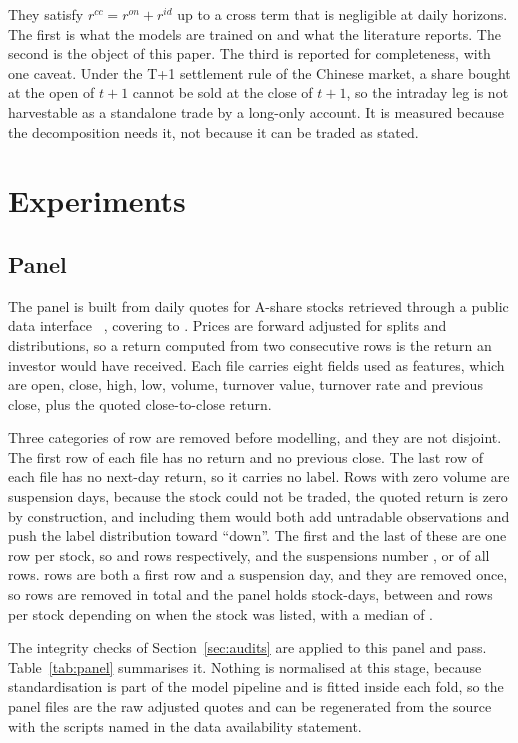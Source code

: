 \documentclass[pdflatex,sn-mathphys-ay]{sn-jnl}
\theoremstyle{thmstyleone}%
\theoremstyle{thmstyletwo}%
\theoremstyle{thmstyletwo}%
\begin{document}
They satisfy $r^{cc} = r^{on} + r^{id}$ up to a cross term that is negligible at daily horizons. The
first is what the models are trained on and what the literature reports. The second is the object of
this paper. The third is reported for completeness, with one caveat. Under the T+1 settlement rule of
the Chinese market, a share bought at the open of $t+1$ cannot be sold at the close of $t+1$, so the
intraday leg is not harvestable as a standalone trade by a long-only account. It is measured because
the decomposition needs it, not because it can be traded as stated.

\section{Experiments}\label{sec5}

\subsection{Panel}

The panel is built from daily quotes for \nStocks{} A-share stocks retrieved through a public data
interface ~\citep{baostock}, covering \firstDate{} to \lastDate{}. Prices are forward adjusted for
splits and distributions, so a return computed from two consecutive rows is the return an investor
would have received. Each file carries eight fields used as features, which are open, close, high,
low, volume, turnover value, turnover rate and previous close, plus the quoted close-to-close return.

Three categories of row are removed before modelling, and they are not disjoint. The first row of each
file has no return and no previous close. The last row of each file has no next-day return, so it
carries no label. Rows with zero volume are suspension days, because the stock could not be traded,
the quoted return is zero by construction, and including them would both add untradable observations
and push the label distribution toward ``down''. The first and the last of these are one row per
stock, so \nNoPrevRows{} and \nNoLabelRows{} rows respectively, and the suspensions number
\nSuspDays{}, or \pctSusp{} of all rows. \nOverlapRows{} rows are both a first row and a suspension
day, and they are removed once, so \nRemovedRows{} rows are removed in total and the panel holds
\nStockDays{} stock-days, between \minRows{} and \maxRows{} rows per stock depending on when the stock
was listed, with a median of \medRows{}.

The integrity checks of Section~\ref{sec:audits} are applied to this panel and pass. Table~\ref{tab:panel}
summarises it. Nothing is normalised at this stage, because standardisation is part of the model
pipeline and is fitted inside each fold, so the panel files are the raw adjusted quotes and can be
regenerated from the source with the scripts named in the data availability statement.
\end{document}
